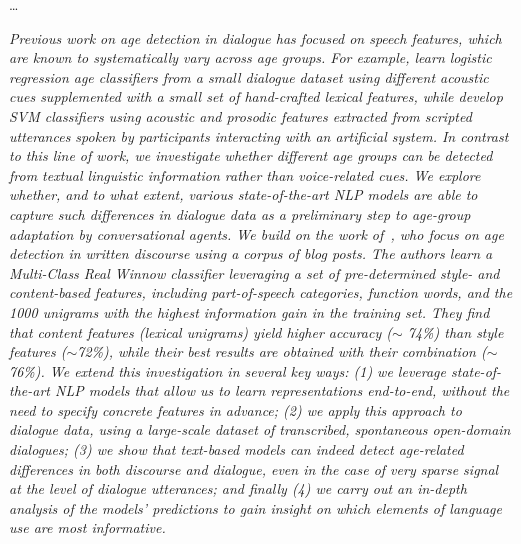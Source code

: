 
\dots


\textit{Previous work on age detection in dialogue has focused on speech features, which are known to systematically vary across age groups. For example,  \citet{wolters2009age} learn logistic regression age classifiers from a small dialogue dataset %
using different acoustic cues supplemented with a small set of hand-crafted lexical features, while \citet{li2013automatic} develop SVM classifiers using acoustic and prosodic features extracted from scripted utterances spoken by participants interacting with an artificial system. In contrast to this line of work, we investigate whether different age groups can be detected from textual linguistic information rather than voice-related cues. We explore whether, and to what extent, various state-of-the-art NLP models are able to capture such differences in dialogue data as a preliminary step to age-group adaptation by conversational agents.
We build on the work of~\citet{schler2006effects}, who focus on age detection in written discourse using a corpus of blog posts. The authors learn a Multi-Class Real Winnow classifier leveraging a set of pre-determined style- and content-based features, including part-of-speech categories, function words, and the 1000 unigrams with the highest information gain in the training set. They find that content features (lexical unigrams) yield higher accuracy ($\sim$ 74\%) than style features ($\sim$72\%), while their best results are obtained with their combination ($\sim$76\%). 
We extend this investigation in several key ways: (1) we leverage state-of-the-art NLP models that allow us to learn representations end-to-end, without the need to specify concrete features in advance; (2) we apply this approach to dialogue data, using a large-scale dataset of transcribed, spontaneous open-domain dialogues; (3) we show that text-based models can indeed detect age-related differences in both discourse and dialogue, even in the case of very sparse signal at the level of dialogue utterances; and finally (4) we carry out an in-depth analysis of the models' predictions to gain insight on which elements of language use are most informative. }

